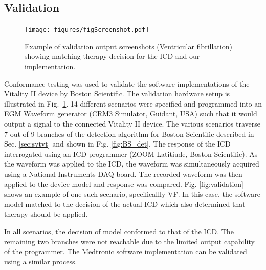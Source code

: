 \subsection{Validation}
\label{sec:validation}

\begin{figure}[t]
	\centering
	\texttt{[image: figures/figScreenshot.pdf]}
	\caption{\small Example of validation output screenshots (Ventricular fibrillation) showing matching therapy decision for the ICD and our implementation.}
	\label{fig:dev_validation}
\end{figure}

Conformance testing was used to validate the software implementations of the Vitality II device by Boston Scientific. 
The validation hardware setup is illustrated in Fig.~\ref{fig:dev_validation}. 
14 different scenarios were specified and programmed into an EGM Waveform generator (CRM3 Simulator, Guidant, USA) such that it would output a signal to the connected Vitality II device.
The various scenarios traverse 7 out of 9 branches of the detection algorithm for Boston Scientific described in Sec. \ref{sec:svtvt} and shown in Fig. \ref{fig:BS_det}. 
The response of the ICD interrogated using an ICD programmer (ZOOM Latitiude, Boston Scientific).
As the waveform was applied to the ICD, the waveform was simultaneously acquired using a National Instruments DAQ board.
The recorded waveform was then applied to the device model and response was compared.
Fig. \ref{fig:validation} shows an example of one such scenario, specificallly VF. 
In this case, the software model matched to the decision of the actual ICD which also determined that therapy should be applied.

In all scenarios, the decision of model conformed to that of the ICD. 
The remaining two branches were not reachable due to the limited output capability of the programmer.
The Medtronic software implementation can be validated using a similar process.


